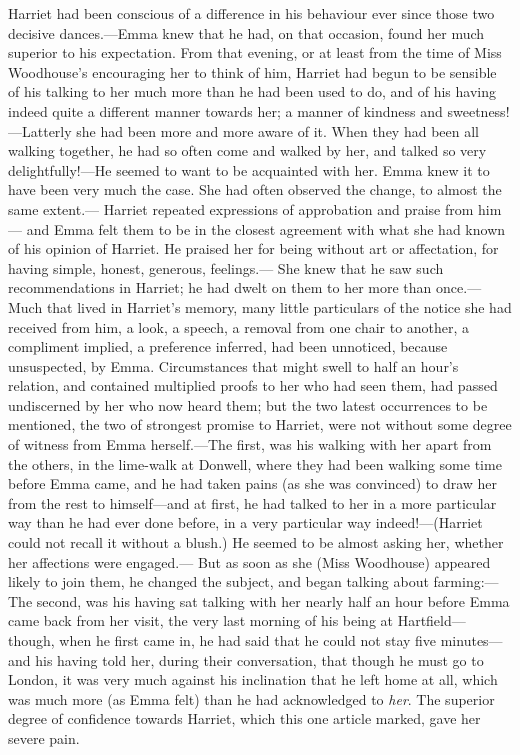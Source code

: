 Harriet had been conscious of a difference in his behaviour ever since
those two decisive dances.---Emma knew that he had, on that occasion,
found her much superior to his expectation.  From that evening,
or at least from the time of Miss Woodhouse's encouraging her
to think of him, Harriet had begun to be sensible of his talking
to her much more than he had been used to do, and of his having
indeed quite a different manner towards her; a manner of kindness
and sweetness!---Latterly she had been more and more aware of it.
When they had been all walking together, he had so often come and walked
by her, and talked so very delightfully!---He seemed to want to be
acquainted with her.  Emma knew it to have been very much the case.
She had often observed the change, to almost the same extent.---%
Harriet repeated expressions of approbation and praise from him---%
and Emma felt them to be in the closest agreement with what she had
known of his opinion of Harriet.  He praised her for being without
art or affectation, for having simple, honest, generous, feelings.---%
She knew that he saw such recommendations in Harriet; he had dwelt
on them to her more than once.---Much that lived in Harriet's memory,
many little particulars of the notice she had received from him, a look,
a speech, a removal from one chair to another, a compliment implied,
a preference inferred, had been unnoticed, because unsuspected,
by Emma.  Circumstances that might swell to half an hour's relation,
and contained multiplied proofs to her who had seen them, had passed
undiscerned by her who now heard them; but the two latest occurrences
to be mentioned, the two of strongest promise to Harriet, were not
without some degree of witness from Emma herself.---The first,
was his walking with her apart from the others, in the lime-walk
at Donwell, where they had been walking some time before Emma came,
and he had taken pains (as she was convinced) to draw her from
the rest to himself---and at first, he had talked to her in a more
particular way than he had ever done before, in a very particular
way indeed!---(Harriet could not recall it without a blush.) He seemed
to be almost asking her, whether her affections were engaged.---%
But as soon as she (Miss Woodhouse) appeared likely to join them,
he changed the subject, and began talking about farming:---%
The second, was his having sat talking with her nearly half an hour
before Emma came back from her visit, the very last morning of his
being at Hartfield---though, when he first came in, he had said
that he could not stay five minutes---and his having told her,
during their conversation, that though he must go to London,
it was very much against his inclination that he left home at all,
which was much more (as Emma felt) than he had acknowledged to \emph{her}.
The superior degree of confidence towards Harriet, which this one
article marked, gave her severe pain.

